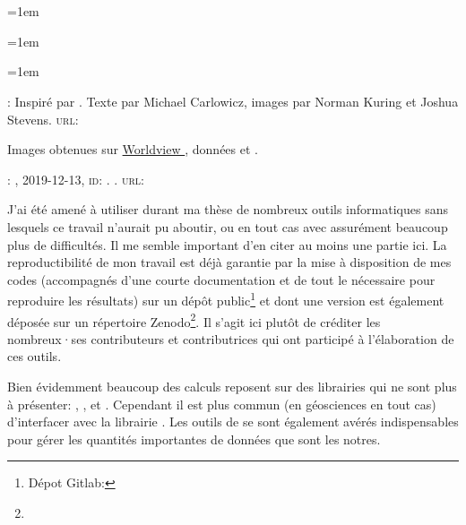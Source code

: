 
\chapter*{\bibname}
\mtcaddchapter[\bibname]
\markboth{\bibname}{}
\label{bib}

{
  \nocite{quenouille_1966}
  \emergencystretch=1em
  \printbibliography[heading=none, filter=normal]
}

\unsection{\bibdataTitle}
\label{bib:data}

{
  \emergencystretch=1em
  \printbibliography[heading=none, type=dataset]
}

\label{bib:illustration}

{
  \setlength{\parindent}{0pt}
  \emergencystretch=1em

  : Inspiré par .
  Texte par Michael Carlowicz, images par Norman Kuring et Joshua Stevens.
  \textsc{url:} 

  Images obtenues sur \href{https://worldview.earthdata.nasa.gov}{Worldview }, données  et .

  \medskip

  : , 2019-12-13, \textsc{id}: .
  .
  \textsc{url:} 
}

\unsection{\bibsoftwareTitle}
\label{bib:software}

J'ai été amené à utiliser durant ma thèse de nombreux outils informatiques sans lesquels ce travail n'aurait pu aboutir, ou en tout cas avec assurément beaucoup plus de difficultés.
Il me semble important d'en citer au moins une partie ici.
La reproductibilité de mon travail est déjà garantie par la mise à disposition de mes codes (accompagnés d'une courte documentation et de tout le nécessaire pour reproduire les résultats) sur un dépôt public\footnote{%
  Dépot Gitlab: }
et dont une version est également déposée sur un répertoire Zenodo\footnote{}.
Il s'agit ici plutôt de créditer les nombreux·ses contributeurs et contributrices qui ont participé à l'élaboration de ces outils.

Bien évidemment beaucoup des calculs reposent sur des librairies qui ne sont plus à présenter: , , et .
Cependant il est plus commun (en géosciences en tout cas) d'interfacer avec la librairie .
Les outils de  se sont également avérés indispensables pour gérer les quantités importantes de données que sont les notres.

